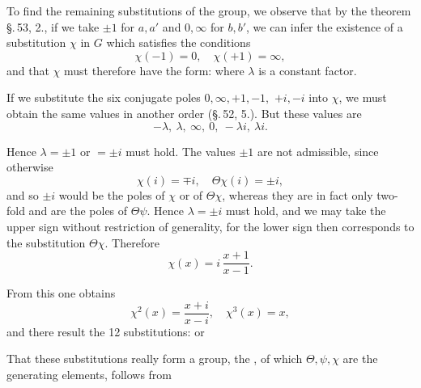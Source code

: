 To find the remaining substitutions of the group, we observe that by the theorem \S.\,53, 2., if we take $\pm 1$ for $a, a'$ and $0, \infty$ for $b, b'$, we can infer the existence of a substitution $\chi$ in $G$ which satisfies the conditions
\[
\chi(-1) = 0, \quad \chi(+1) = \infty,
\]
and that $\chi$ must therefore have the form:
where $\lambda$ is a constant factor.

If we substitute the six conjugate poles $0, \infty, +1, -1,$
$+i, -i$ into $\chi$, we must obtain the same values in another order (\S.\,52, 5.). But these values are
\[
-\lambda,\ \lambda,\ \infty,\ 0,\ -\lambda i,\ \lambda i.
\]

Hence $\lambda = \pm 1$ or $= \pm i$ must hold. The values $\pm 1$ are not admissible, since otherwise
\[
\chi(i) = \mp i, \quad \Theta\chi(i) = \pm i,
\]
and so $\pm i$ would be the poles of $\chi$ or of $\Theta\chi$, whereas they are in fact only two-fold and are the poles of $\Theta\psi$. Hence $\lambda = \pm i$ must hold, and we may take the upper sign without restriction of generality, for the lower sign then corresponds to the substitution $\Theta\chi$. Therefore
\[
\chi(x) = i\,\frac{x+1}{x-1}.
\]

From this one obtains
\[
\chi^2(x) = \frac{x+i}{x-i}, \quad \chi^3(x) = x,
\]
and there result the 12 substitutions:
or

That these substitutions really form a group, the , of which $\Theta, \psi, \chi$ are the generating elements, follows from
